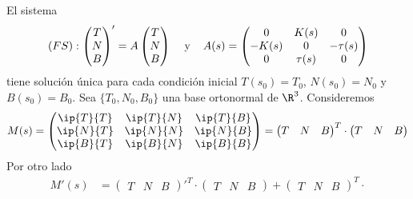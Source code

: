 \documentclass{article}
\begin{document}
\begin{dem}
    El sistema
    \begin{equation*}
        (FS):\begin{pmatrix}
            T \\ N \\ B
        \end{pmatrix}'
        =A
        \begin{pmatrix}
            T \\ N \\ B
        \end{pmatrix}
        \hspace{4mm}\text{y}\hspace{4mm}A(s)=
        \begin{pmatrix}
            0 & K(s) & 0 \\
            -K(s) & 0 & -\tau(s) \\
            0 & \tau(s) & 0
        \end{pmatrix}
    \end{equation*}
    tiene solución única para cada condición inicial $T(s_{0})=T_{0}$, $N(s_{0})=N_{0}$ y 
    $B(s_{0})=B_{0}$. Sea $\{T_{0},N_{0},B_{0}\}$ una base ortonormal de $\R^{3}$. Consideremos
    \begin{equation*}
        M(s)=
        \begin{pmatrix}
            \ip{T}{T} & \ip{T}{N} & \ip{T}{B} \\
            \ip{N}{T} & \ip{N}{N} & \ip{N}{B} \\
            \ip{B}{T} & \ip{B}{N} & \ip{B}{B}
        \end{pmatrix}
        =
        \begin{pmatrix}
            T & N & B
        \end{pmatrix}^{T}\cdot
        \begin{pmatrix}
            T & N & B
        \end{pmatrix}
    \end{equation*}
    Por otro lado
    \begin{align*}
        M'(s) &=
        \begin{pmatrix}
            T & N & B
        \end{pmatrix}'^{T}\cdot
        \begin{pmatrix}
            T & N & B
        \end{pmatrix}+
        \begin{pmatrix}
            T & N & B
        \end{pmatrix}^{T}\cdot

\end{align*}
\end{dem}
\end{document}
